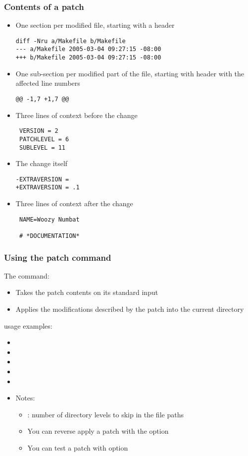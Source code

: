 \begin{frame}[fragile]
  \frametitle{Contents of a patch}
  \begin{itemize}
  \item One section per modified file, starting with a header
\scriptsize
\begin{verbatim}
diff -Nru a/Makefile b/Makefile
--- a/Makefile 2005-03-04 09:27:15 -08:00
+++ b/Makefile 2005-03-04 09:27:15 -08:00
\end{verbatim}
\normalsize
  \item One sub-section per modified part of the file, starting with
    header with the affected line numbers
\scriptsize
\begin{verbatim}
@@ -1,7 +1,7 @@
\end{verbatim}
\normalsize
  \item Three lines of context before the change
\scriptsize
\begin{verbatim}
 VERSION = 2
 PATCHLEVEL = 6
 SUBLEVEL = 11
\end{verbatim}
\normalsize
  \item The change itself
\scriptsize
\begin{verbatim}
-EXTRAVERSION =
+EXTRAVERSION = .1
\end{verbatim}
\normalsize
    \item Three lines of context after the change
\scriptsize
\begin{verbatim}
 NAME=Woozy Numbat

 # *DOCUMENTATION*
\end{verbatim}
\normalsize
    \end{itemize}
\end{frame}

\begin{frame}
  \frametitle{Using the patch command}
  The  command:
  \begin{itemize}
  \item Takes the patch contents on its standard input
  \item Applies the modifications described by the patch into the
    current directory
  \end{itemize}
   usage examples:
  \begin{itemize}
  \item {}
  \item {}
  \item {}
  \item {}
  \item {}
  \item Notes:
    \begin{itemize}
    \item {}: number of directory levels to skip in the file paths
    \item You can reverse apply a patch with the  option
    \item You can test a patch with  option
    \end{itemize}
  \end{itemize}
\end{frame}

